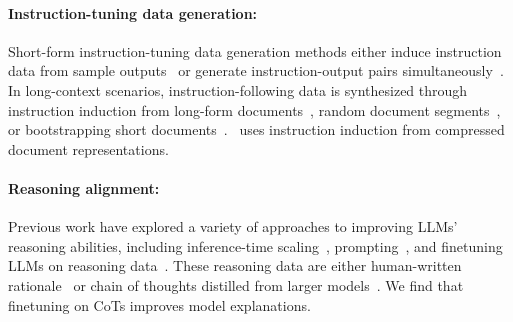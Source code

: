 \paragraph{Instruction-tuning data generation:} 
Short-form instruction-tuning data generation methods either induce instruction data from sample outputs~\cite{honovich2022instructioninductionexamplesnatural, zhou2023largelanguagemodelshumanlevel, li2024selfalignmentinstructionbacktranslation} or generate instruction-output pairs simultaneously~\cite{wang2023selfinstructaligninglanguagemodels}. In long-context scenarios, instruction-following data is synthesized through instruction induction from long-form documents~\cite{bai_longalign_2024, pham_suri_2024, koksal_longform_2023}, random document segments~\cite{xiong_effective_2023, dubey2024llama, yang_qwen25-1m_2025}, or bootstrapping short documents~\cite{an2024makellmfullyutilize, xu2024chatqa2bridginggap, wu2024longcontextalignmentshort, wang2024bootstrapcontextlength}. \pipeline\ uses instruction induction from compressed document representations.

\vspace{-2pt}
\paragraph{Reasoning alignment:}
Previous work have explored a variety of approaches to improving LLMs' reasoning abilities, including inference-time scaling~\cite{openai_o1_2024, deepseekai2025deepseekr1incentivizingreasoningcapability, muennighoff2025s1simpletesttimescaling}, prompting~\cite{wei_chain--thought_2023, kojima2023largelanguagemodelszeroshot,yao2023treethoughtsdeliberateproblem, wang2023selfconsistencyimproveschainthought}, and finetuning LLMs on reasoning data~\cite{chung_scaling_2022, huang-etal-2023-large, puerto2024finetuningdivergentchainsthought, yeo2025demystifyinglongchainofthoughtreasoning}. These reasoning data are either human-written rationale~\cite{alkhamissi_opt-r_2023} or chain of thoughts distilled from larger models~\cite{hsieh-etal-2023-distilling,li-etal-2023-symbolic, ho-etal-2023-large, zelikman2022starbootstrappingreasoningreasoning}. We find that finetuning on CoTs improves model explanations.

